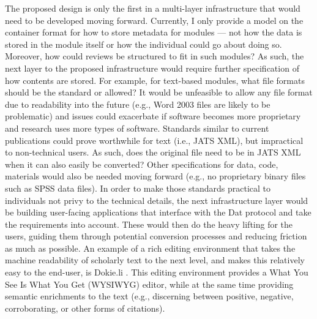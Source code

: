 \documentclass[publications,article,submit,moreauthors,pdftex,10pt,a4paper]{Definitions/mdpi}
\begin{document}
The proposed design is only the first in a multi-layer infrastructure
that would need to be developed moving forward. Currently, I only
provide a model on the container format for how to store metadata for
modules --- not how the data is stored in the module itself or how the
individual could go about doing so. Moreover, how could reviews be
structured to fit in such modules?  As such, the next layer to the
proposed infrastructure would require further specification of how
contents are stored. For example, for text-based modules, what file
formats should be the standard or allowed? It would be unfeasible to
allow any file format due to readability into the future (e.g., Word
2003 files are likely to be problematic) and issues could exacerbate
if software becomes more proprietary and research uses more types of
software. Standards similar to current publications could prove
worthwhile for text (i.e., JATS XML), but impractical to non-technical
users. As such, does the original file need to be in JATS XML when it
can also easily be converted? \citep[e.g., Markdown to JATS
  XML;][]{jatdown} Other specifications for data, code, materials
would also be needed moving forward (e.g., no proprietary binary files
such as SPSS data files). In order to make those standards practical
to individuals not privy to the technical details, the next
infrastructure layer would be building user-facing applications that
interface with the Dat protocol and take the requirements into
account. These would then do the heavy lifting for the users, guiding
them through potential conversion processes and reducing friction as
much as possible. An example of a rich editing environment that takes
the machine readability of scholarly text to the next level, and makes
this relatively easy to the end-user, is Dokie.li \citep[which writes
  to HTML;][]{dokieli}. This editing environment provides a What You
See Is What You Get (WYSIWYG) editor, while at the same time providing
semantic enrichments to the text (e.g., discerning between positive,
negative, corroborating, or other forms of citations).
\end{document}

